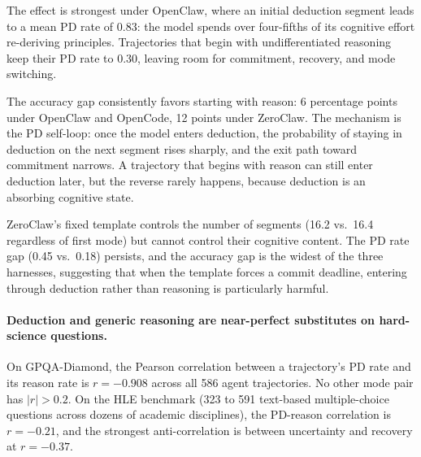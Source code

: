 
The effect is strongest under OpenClaw, where an initial deduction segment
leads to a mean PD rate of 0.83: the model spends over four-fifths of its
cognitive effort re-deriving principles.
Trajectories that begin with undifferentiated reasoning keep their PD rate
to 0.30, leaving room for commitment, recovery, and mode switching.

The accuracy gap consistently favors starting with reason: 6 percentage
points under OpenClaw and OpenCode, 12 points under ZeroClaw.
The mechanism is the PD self-loop: once the model enters deduction, the
probability of staying in deduction on the next segment rises sharply, and
the exit path toward commitment narrows.
A trajectory that begins with reason can still enter deduction later, but
the reverse rarely happens, because deduction is an absorbing cognitive
state.

ZeroClaw's fixed template controls the number of segments (16.2 vs.\ 16.4
regardless of first mode) but cannot control their cognitive content.
The PD rate gap (0.45 vs.\ 0.18) persists, and the accuracy gap is the
widest of the three harnesses, suggesting that when the template forces a
commit deadline, entering through deduction rather than reasoning is
particularly harmful.

\paragraph{Deduction and generic reasoning are near-perfect substitutes on
hard-science questions.}

On GPQA-Diamond, the Pearson correlation between a trajectory's PD rate and
its reason rate is $r = -0.908$ across all 586 agent trajectories.
No other mode pair has $|r| > 0.2$.
On the HLE benchmark (323 to 591 text-based multiple-choice questions across
dozens of academic disciplines), the PD-reason correlation is $r = -0.21$,
and the strongest anti-correlation is between uncertainty and recovery at
$r = -0.37$.


